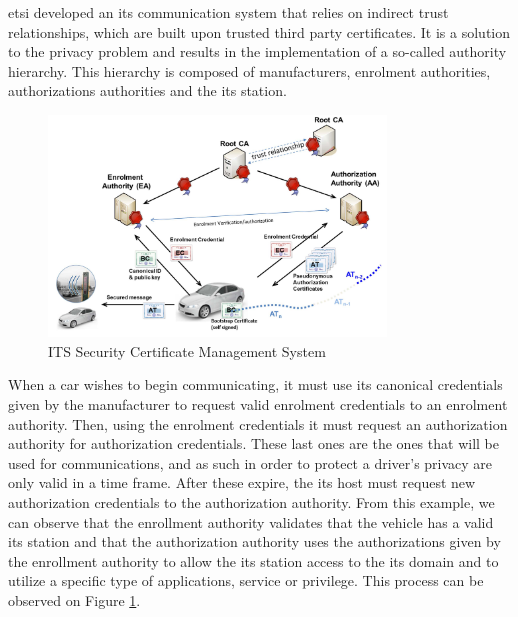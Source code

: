 \gls{etsi} developed an \gls{its} communication system that relies on indirect trust relationships, which are built upon trusted third party certificates. It is a solution to the privacy problem and results in the implementation of a so-called authority hierarchy. This hierarchy is composed of manufacturers, enrolment authorities, authorizations authorities and the \gls{its} station.

\begin{figure}[htbp]
    \centering
    \includegraphics[width=0.8\textwidth]{Chapters/Figures/VANETs/pki.png}
   	\caption{ITS Security Certificate Management System~\cite{etsi_intelligent_2018}}
   	\label{fig:pki}
\end{figure}


When a car wishes to begin communicating, it must use its canonical credentials given by the manufacturer to request valid enrolment credentials to an enrolment authority. Then, using the enrolment credentials it must request an authorization authority for authorization credentials. These last ones are the ones that will be used for communications, and as such in order to protect a driver's privacy are only valid in a time frame. After these expire, the \gls{its} host must request new authorization credentials to the authorization authority.
From this example, we can observe that the enrollment authority validates that the vehicle has a valid \gls{its} station and that the authorization authority uses the authorizations given by the enrollment authority to allow the \gls{its} station access to the \gls{its} domain and to utilize a specific type of applications, service or privilege. This process can be observed on Figure \ref{fig:pki}.
\cite{etsi_intelligent_2021}


